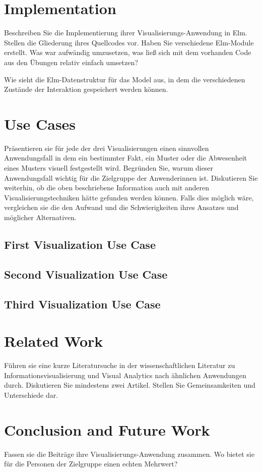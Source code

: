 \documentclass[usegeometry=true]{scrartcl}
\begin{document}
\section{Implementation}
Beschreiben Sie die Implementierung ihrer Visualisierungs-Anwendung in Elm. Stellen die Gliederung ihres Quellcodes vor. Haben Sie verschiedene Elm-Module erstellt. Was war aufwändig umzusetzen, was ließ sich mit dem vorhanden Code aus den Übungen relativ einfach umsetzen?

Wie sieht die Elm-Datenstruktur für das Model aus, in dem die verschiedenen Zustände der Interaktion gespeichert werden können.

\section{Use Cases}
Präsentieren sie für jede der drei Visualisierungen einen sinnvollen Anwendungsfall in dem ein bestimmter Fakt, ein Muster oder die Abwesenheit eines Musters visuell festgestellt wird. Begründen Sie, warum dieser Anwendungsfall wichtig für die Zielgruppe der Anwenderinnen ist. Diskutieren Sie weiterhin, ob die oben beschriebene Information auch mit anderen Visualisierungstechniken hätte gefunden werden können. Falls dies möglich wäre, vergleichen sie die den Aufwand und die Schwierigkeiten ihres Ansatzes und möglicher Alternativen.
\subsection{First Visualization Use Case}
\subsection{Second Visualization Use Case}
\subsection{Third Visualization Use Case}

\section{Related Work}
Führen sie eine kurze Literatursuche in der wissenschaftlichen Literatur zu Informationsvisualisierung und Visual Analytics nach ähnlichen Anwendungen durch. Diskutieren Sie mindestens zwei Artikel. Stellen Sie Gemeinsamkeiten und Unterschiede dar.

\section{Conclusion and Future Work}
Fassen sie die Beiträge ihre Visualisierungs-Anwendung zusammen. Wo bietet sie für die Personen der Zielgruppe einen echten Mehrwert?
\end{document}
